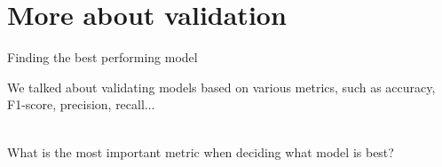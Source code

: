 \documentclass[handout]{beamer}
\begin{document}
	
	
	
	


	
	
	
	
	
	
	


\section{More about validation}

\begin{frame}{Finding the best performing model}

We talked about validating models based on various metrics, such as accuracy, F1-score, precision, recall... \\\

What is the most important metric when deciding what model is best?
\end{frame}
\end{document}
